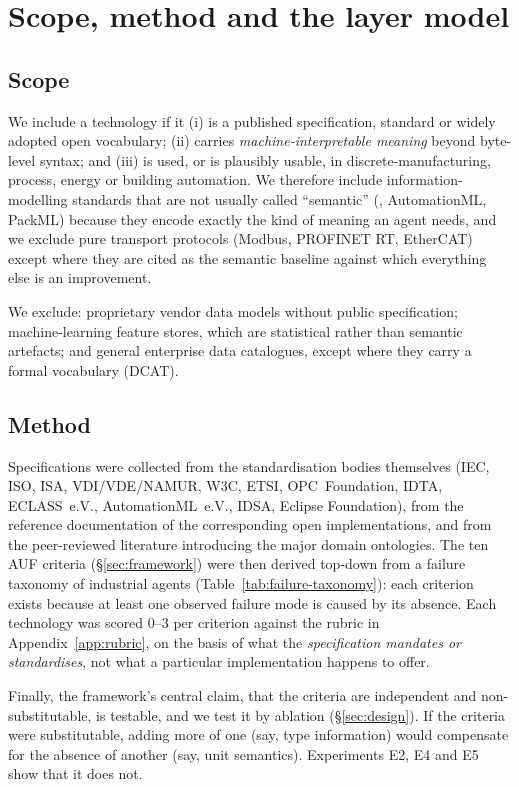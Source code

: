 \section{Scope, method and the layer model}
\label{sec:scope}

\subsection{Scope}

We include a technology if it (i) is a published specification, standard or
widely adopted open vocabulary; (ii) carries \emph{machine-interpretable meaning}
beyond byte-level syntax; and (iii) is used, or is plausibly usable, in
discrete-manufacturing, process, energy or building automation. We therefore
include information-modelling standards that are not usually called ``semantic''
(\opcua, AutomationML, PackML) because they encode exactly the kind of meaning an
agent needs, and we exclude pure transport protocols (Modbus, PROFINET RT,
EtherCAT) except where they are cited as the semantic baseline against which
everything else is an improvement.

We exclude: proprietary vendor data models without public specification;
machine-learning feature stores, which are statistical rather than semantic
artefacts; and general enterprise data catalogues, except where they carry a
formal vocabulary (DCAT).

\subsection{Method}

Specifications were collected from the standardisation bodies themselves (IEC,
ISO, ISA, VDI/VDE/NAMUR, W3C, ETSI, OPC~Foundation, IDTA, ECLASS~e.V.,
AutomationML~e.V., IDSA, Eclipse Foundation), from the reference documentation
of the corresponding open implementations, and from the peer-reviewed literature
introducing the major domain ontologies. The ten AUF criteria
(\S\ref{sec:framework}) were then derived top-down from a failure taxonomy of
industrial agents (Table~\ref{tab:failure-taxonomy}): each criterion exists
because at least one observed failure mode is caused by its absence. Each
technology was scored $0$--$3$ per criterion against the rubric in
Appendix~\ref{app:rubric}, on the basis of what the \emph{specification mandates
or standardises}, not what a particular implementation happens to offer.

Finally, the framework's central claim, that the criteria are independent and
non-substitutable, is testable, and we test it by ablation
(\S\ref{sec:design}). If the criteria were substitutable, adding more of one
(say, type information) would compensate for the absence of another (say, unit
semantics). Experiments E2, E4 and E5 show that it does not.

